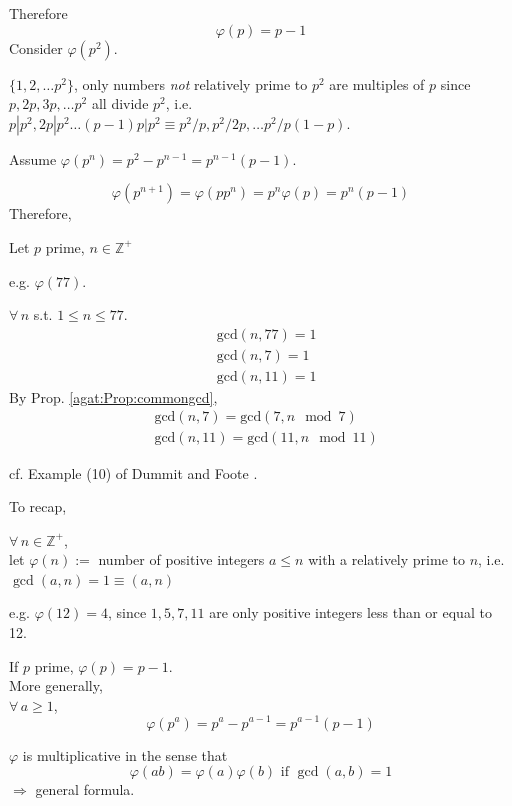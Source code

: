 Therefore 
\[
\varphi(p) = p-1
\]
Consider $\varphi(p^2)$.  

$\lbrace 1,2,\dots p^2\rbrace$, only numbers \emph{not} relatively prime to $p^2$ are multiples of $p$ since \\
$p,2p, 3p, \dots p^2$ all divide $p^2$, i.e. $p|p^2, 2p|p^2 \dots (p-1)p | p^2 \equiv p^2 /p , p^2 /2p , \dots p^2 / p(1-p)$.  

Assume $\varphi(p^n) = p^2 - p^{n-1} = p^{n-1}(p-1)$.  

\[
\varphi(p^{n+1}) = \varphi(pp^{n}) = p^n\varphi(p) = p^n(p-1)
\]
Therefore,
\begin{proposition}[5.1]
Let $p$ prime, $n\in \mathbb{Z}^+$
\end{proposition}


e.g. $\varphi(77)$.  

$\forall \, n $ s.t. $1\leq n \leq 77$.  
\[
\begin{aligned}
	& \text{gcd}(n,77)=1 \\ 
	& \text{gcd}(n,7)=1 \\ 
	& \text{gcd}(n,11)=1  
\end{aligned}
\]
By Prop. \ref{agat:Prop:commongcd}, 
\[
\begin{aligned}
	& \text{gcd}(n,7) = \text{gcd}(7, n\mod{7}) \\ 
	& \text{gcd}(n,11) = \text{gcd}(11, n\mod{11}) 
\end{aligned}
\]




cf. Example (10) of Dummit and Foote \cite{agat:DuFo2003}.  

To recap, 
\begin{definition}
$\forall \, n \in \mathbb{Z}^+$, \\
let $\varphi(n)  := $ number of positive integers $a \leq n$ with a relatively prime to $n$, i.e. $\gcd(a,n) = 1 \equiv (a,n)$
\end{definition}
e.g. $\varphi(12)=4$, since $1,5,7,11$ are only positive integers less than or equal to 12.  

If $p$ prime, 
$\varphi(p) = p-1$.  \\
More generally, \\
$\forall \, a \geq 1$, 
\begin{equation}\label{agat:Eq:EulerTotientOfPrimeFactor}
\boxed{ \varphi(p^a) = p^a - p^{a-1} = p^{a-1} (p-1) }
\end{equation}

$\varphi$ is multiplicative in the sense that 
\begin{equation}\label{agat:Eq:EulerTotientIsMultiplicative}
\varphi(ab) = \varphi(a) \varphi(b)  \text{ if } \gcd(a,b) = 1
\end{equation}
$\Longrightarrow $ general formula.  

